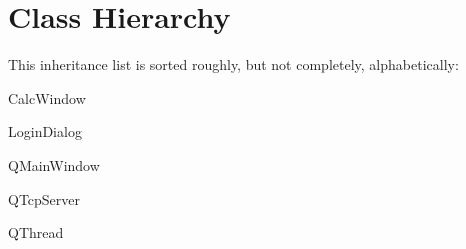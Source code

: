 \section{Class Hierarchy}
This inheritance list is sorted roughly, but not completely, alphabetically\+:\begin{DoxyCompactList}
\item Calc\+Window\begin{DoxyCompactList}
\item {}
\end{DoxyCompactList}
\item {}
\begin{DoxyCompactList}
\item {}
\end{DoxyCompactList}
\item Login\+Dialog\begin{DoxyCompactList}
\item {}
\end{DoxyCompactList}
\item Q\+Main\+Window\begin{DoxyCompactList}
\item {}
\end{DoxyCompactList}
\item Q\+Tcp\+Server\begin{DoxyCompactList}
\item {}
\begin{DoxyCompactList}
\item {}
\end{DoxyCompactList}
\end{DoxyCompactList}
\item Q\+Thread\begin{DoxyCompactList}
\item {}
\begin{DoxyCompactList}
\item {}
\end{DoxyCompactList}

\end{DoxyCompactList}
\end{DoxyCompactList}
